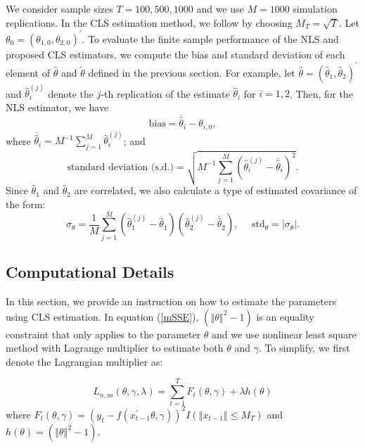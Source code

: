 \documentclass[a4paper,12pt,times,numbered,print,index]{report}
\numberwithin{equation}{section}
\begin{document}
	We consider sample sizes $T=100,500,1000$ and we use $M = 1000$ simulation  replications. In the CLS estimation method, we follow \cite{li2016estimation} by choosing $M_{T}=\sqrt{T}$. Let $\theta_0=\left( \theta%
	_{1,0},\theta_{2,0}\right) ^{\prime }$. To evaluate the finite sample performance of the NLS and proposed CLS estimators, we compute the bias and standard deviation of each element of $\hat{\theta}$ and $\tilde{\theta}$ defined in the previous section. For example, let $\widehat{\theta}=\left( \widehat{\theta}_{1},\widehat{\theta}_{2}\right) ^{\prime }$ and $\widehat{\theta}_{i}^{(j)}$ denote the $j$-th replication of
	the estimate $\widehat{\theta}_{i}$ for $i = 1,2$. Then, for the NLS estimator, we have%
	\[
	\text{bias}=\overline{\widehat{\theta}}_{i}-\theta _{i,0}, 
	\]%
	where $\overline{\widehat{\theta}}_{i}=M^{-1}\sum_{j=1}^{M}\widehat{\theta}_{i}^{(j)} $; and  
	\[
	\text{standard deviation (s.d.)}=\sqrt{M^{-1}\sum_{j=1}^{M}\left( \widehat{\theta}_{i}^{(j)}-\overline{\widehat{\theta}}_{i}\right) ^{2}}. 
	\]%
	Since $\widehat{\theta}_1$ and $\widehat{\theta}_{2}$ are correlated, we also calculate a type of estimated covariance of the form:
	\begin{equation}
		\label{std of theta}
		\sigma_{\theta}=\frac{1}{M} \sum_{j=1}^{M}\left(\widehat{\theta}_{1}^{(j)}-\overline{\widehat{\theta}}_{1}\right)\left(\widehat{\theta}_{2}^{(j)}-\overline{\widehat{\theta}}_{2}\right), \quad \text { std}_{\theta}=|\sigma_{\theta}|.
	\end{equation}
	
	\subsection{Computational Details}
	In this section, we provide an instruction on how to estimate the parameters using CLS estimation. In equation (\ref{mSSE}), $\left( \left\Vert \theta\right\Vert ^{2}-1\right)$ is an equality constraint that only applies to the parameter $\theta$ and we use nonlinear least square method with Lagrange multiplier to estimate both $\theta$ and $\gamma$. To simplify, we first denote the Lagrangian multiplier as:
	
	$$
	L_{n,m}\left( \theta ,\gamma,\lambda\right) =\sum_{t=1}^{T}F_t(\theta ,\gamma) +\lambda h(\theta)
	$$
	where $F_t(\theta ,\gamma) = \left( y_{t}-f\left(x_{t-1}^{\prime }\theta ,\gamma \right) \right) ^{2}I\left( \left\Vert
	x_{t-1}\right\Vert \leq M_{T}\right)$ and $h(\theta)=\left( \left\Vert \theta \right\Vert ^{2}-1\right)$.
	
\end{document}
